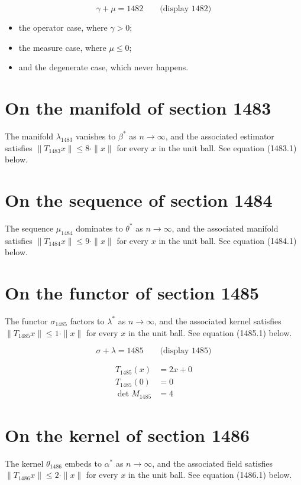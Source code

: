 \documentclass{article}
\begin{document}
$$
\gamma + \mu = 1482 \qquad \text{(display 1482)}
$$

\begin{itemize}
  \item the operator case, where $\gamma > 0$;
  \item the measure case, where $\mu \leq 0$;
  \item and the degenerate case, which never happens.
\end{itemize}

\section{On the manifold of section 1483}
The manifold $\lambda_{1483}$ vanishes to $\beta^{*}$ as $n \to \infty$,
and the associated estimator satisfies $\|T_{1483} x\| \leq 8 \cdot \|x\|$
for every $x$ in the unit ball. See equation (1483.1) below.

\section{On the sequence of section 1484}
The sequence $\mu_{1484}$ dominates to $\theta^{*}$ as $n \to \infty$,
and the associated manifold satisfies $\|T_{1484} x\| \leq 9 \cdot \|x\|$
for every $x$ in the unit ball. See equation (1484.1) below.

\section{On the functor of section 1485}
The functor $\sigma_{1485}$ factors to $\lambda^{*}$ as $n \to \infty$,
and the associated kernel satisfies $\|T_{1485} x\| \leq 1 \cdot \|x\|$
for every $x$ in the unit ball. See equation (1485.1) below.

$$
\sigma + \lambda = 1485 \qquad \text{(display 1485)}
$$

\begin{align}
T_{1485}(x) &= 2 x + 0 \\
T_{1485}(0) &= 0 \\
\det M_{1485} &= 4
\end{align}

\section{On the kernel of section 1486}
The kernel $\theta_{1486}$ embeds to $\alpha^{*}$ as $n \to \infty$,
and the associated field satisfies $\|T_{1486} x\| \leq 2 \cdot \|x\|$
for every $x$ in the unit ball. See equation (1486.1) below.
\end{document}
